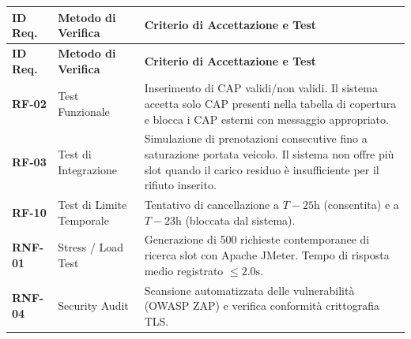 \begin{center}
\renewcommand{\arraystretch}{1.3}
\begin{longtable}{|p{2cm}|p{6cm}|p{7.2cm}|}
\hline
\rowcolor{tableheader} \textbf{ID Req.} & \textbf{Metodo di Verifica} & \textbf{Criterio di Accettazione e Test} \\ \hline
\endfirsthead

\hline
\rowcolor{tableheader} \textbf{ID Req.} & \textbf{Metodo di Verifica} & \textbf{Criterio di Accettazione e Test} \\ \hline
\endhead

\textbf{RF-02} & Test Funzionale & Inserimento di CAP validi/non validi. Il sistema accetta solo CAP presenti nella tabella di copertura e blocca i CAP esterni con messaggio appropriato. \\ \hline

\textbf{RF-03} & Test di Integrazione & Simulazione di prenotazioni consecutive fino a saturazione portata veicolo. Il sistema non offre più slot quando il carico residuo è insufficiente per il rifiuto inserito. \\ \hline

\textbf{RF-10} & Test di Limite Temporale & Tentativo di cancellazione a $T - 25\text{h}$ (consentita) e a $T - 23\text{h}$ (bloccata dal sistema). \\ \hline

\textbf{RNF-01} & Stress / Load Test & Generazione di 500 richieste contemporanee di ricerca slot con Apache JMeter. Tempo di risposta medio registrato $\le 2.0\text{s}$. \\ \hline

\textbf{RNF-04} & Security Audit & Scansione automatizzata delle vulnerabilità (OWASP ZAP) e verifica conformità crittografia TLS. \\ \hline
\end{longtable}
\end{center}

